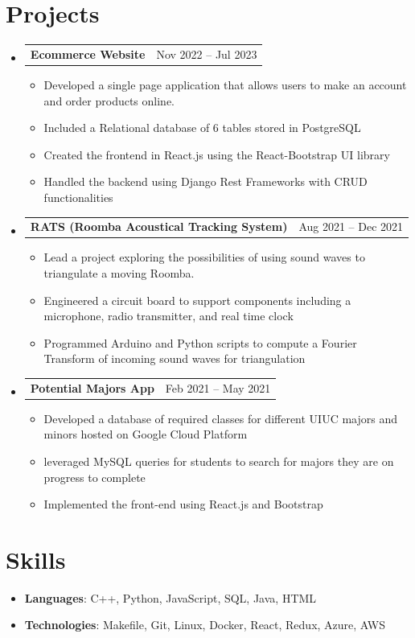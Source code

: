 \documentclass[letterpaper,11pt]{article}
\makeatletter
\newcommand{\resumeItem}[1]{
  \item\small{
    {#1 \vspace{-3pt}}
  }
}
\newcommand{\resumeProjectheading}[2]{
  \vspace{-1pt}\item
    \begin{tabular*}{0.97\textwidth}[t]{l@{\extracolsep{\fill}}r}
      \textbf{#1} & #2 \\
    \end{tabular*}\vspace{-5pt}
}
\newcommand{\resumeSubItem}[2]{\resumeItem{#1}{#2}\vspace{-4pt}}
\newcommand{\resumeSubHeadingListStart}{\begin{itemize}[leftmargin=*]}
\newcommand{\resumeSubHeadingListEnd}{\end{itemize}}
\newcommand{\resumeItemListStart}{\begin{itemize}}
\newcommand{\resumeItemListEnd}{\end{itemize}\vspace{-5pt}}
\makeatother
\begin{document}
\section{Projects}
  \resumeSubHeadingListStart
    \resumeProjectheading
      {Ecommerce Website}{Nov 2022 -- Jul 2023}
      \resumeItemListStart
        \resumeItem{Developed a single page application that allows users to make an account and order products online.}
        \resumeItem{Included a Relational database of 6 tables stored in PostgreSQL }
        \resumeItem{Created the frontend in React.js using the React-Bootstrap UI library}
        \resumeItem{Handled the backend using Django Rest Frameworks with CRUD functionalities}
      \resumeItemListEnd

      \resumeProjectheading
      {RATS (Roomba Acoustical Tracking System)}{Aug 2021 -- Dec 2021}
      \resumeItemListStart
        \resumeItem{Lead a project exploring the possibilities of using sound waves to triangulate a moving Roomba.}
        \resumeItem{Engineered a circuit board to support components including a microphone, radio transmitter, and real time clock}
        \resumeItem{Programmed Arduino and Python scripts to compute a Fourier Transform of incoming sound waves for triangulation}
      \resumeItemListEnd

      \resumeProjectheading
      {Potential Majors App}{Feb 2021 -- May 2021}
      \resumeItemListStart
        \resumeItem{Developed a database of required classes for different UIUC majors and minors hosted on Google Cloud Platform}
        \resumeItem{leveraged MySQL queries for students to search for majors they are on progress to complete}
        \resumeItem{Implemented the front-end using React.js and Bootstrap}
      \resumeItemListEnd
  \resumeSubHeadingListEnd

%
\section{Skills}
 \resumeSubHeadingListStart
   \item{
     \textbf{Languages}{: C++, Python, JavaScript, SQL, Java, HTML}
    }
  \item{
     \textbf{Technologies}{: Makefile, Git, Linux, Docker, React, Redux, Azure, AWS}
    } 
 \resumeSubHeadingListEnd


\end{document}
